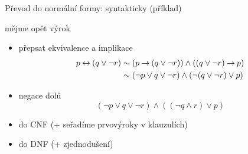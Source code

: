 \documentclass{beamer}
\begin{document}
\begin{frame}{Převod do normální formy: syntakticky (příklad)}

    mějme opět výrok 

    \begin{itemize}
        \item přepsat ekvivalence a implikace
        \begin{align*}
            p\mathbin{\leftrightarrow} (q\lor \neg r) &\sim (p\mathbin{\rightarrow} (q\lor \neg r)) \land ((q\lor \neg r) \mathbin{\rightarrow} p)\\
            &\sim (\neg p\lor q\lor \neg r) \land (\neg (q\lor \neg r) \lor p)
        \end{align*}
        \item negace dolů
        $$
        (\neg p\lor q\lor \neg r) \land ( (\neg q\land r) \lor p)
        $$
        \item do CNF (+ seřadíme prvovýroky v klauzulích)

        \item do DNF (+ zjednodušení)
    \end{itemize}

\end{frame}
\end{document}
